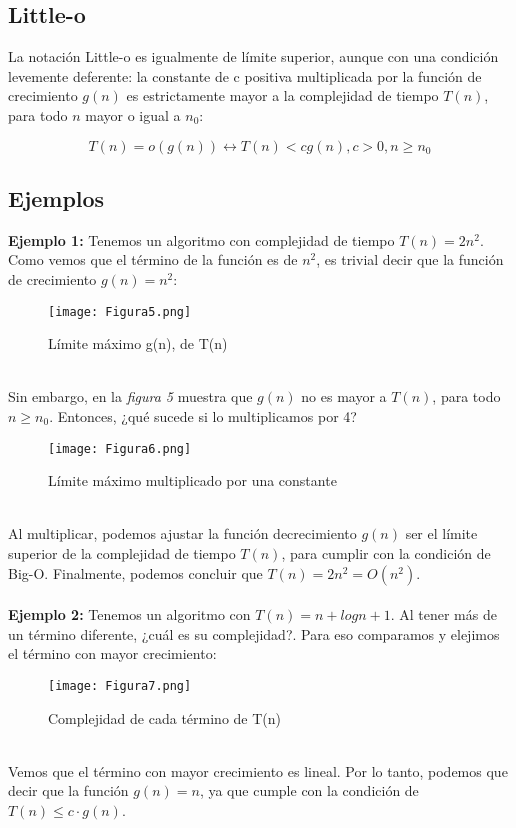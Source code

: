 \documentclass{article}
\begin{document}
\subsection{Little-o}
La notación Little-o es igualmente de límite superior, aunque con una condición levemente deferente: la constante de c positiva multiplicada por la función de crecimiento $g(n)$ es estrictamente mayor a la complejidad de tiempo $T(n)$, para todo $n$ mayor o igual a $n_0$: 

$$T(n)=o(g(n)) \leftrightarrow T(n) < c g(n) , c>0, n\geq n_0$$


\subsection{Ejemplos}
\textbf{Ejemplo 1:} Tenemos un algoritmo con complejidad de tiempo $T(n) = 2n^2$.  Como vemos que el término de la función es de $n^2$, es trivial decir que la función de crecimiento $g(n)=n^2$:
\\
\begin{figure}[h]
    \centering
    \texttt{[image: Figura5.png]}
    \caption{Límite máximo g(n), de T(n)}
    \label{fig:5}
\end{figure}
\\
Sin embargo, en la \textit{figura 5} muestra que $g(n)$ no es mayor a $T(n)$, para todo $n \geq n_0$. Entonces, ¿qué sucede si lo multiplicamos por 4? 
\\
\begin{figure}[h]
    \centering
    \texttt{[image: Figura6.png]}
    \caption{Límite máximo multiplicado por una constante}
    \label{fig:6}
\end{figure}
\\
Al multiplicar, podemos ajustar la función decrecimiento $g(n)$ ser el límite superior de la complejidad de tiempo $T(n)$, para cumplir con la condición de Big-O. Finalmente, podemos concluir que $T(n) = 2n^2 = O(n^2)$.
\\\\
\textbf{Ejemplo 2:} Tenemos un algoritmo con $T(n) = n + logn + 1$. Al tener más de un término diferente, ¿cuál es su complejidad?. Para eso comparamos y elejimos el término con mayor crecimiento:
\\
\begin{figure}[h]
    \centering
    \texttt{[image: Figura7.png]}
    \caption{Complejidad de cada término de T(n)}
    \label{fig:7}
\end{figure}
\\
Vemos que el término con mayor crecimiento es lineal. Por lo tanto, podemos que decir que la función $g(n) = n$, ya que cumple con la condición de $T(n) \leq c\cdot g(n)$.
\end{document}
